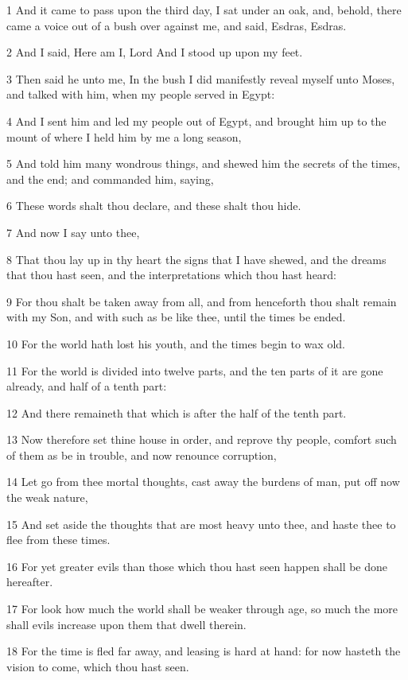 \par 1 And it came to pass upon the third day, I sat under an oak, and, behold, there came a voice out of a bush over against me, and said, Esdras, Esdras.
\par 2 And I said, Here am I, Lord And I stood up upon my feet.
\par 3 Then said he unto me, In the bush I did manifestly reveal myself unto Moses, and talked with him, when my people served in Egypt:
\par 4 And I sent him and led my people out of Egypt, and brought him up to the mount of where I held him by me a long season,
\par 5 And told him many wondrous things, and shewed him the secrets of the times, and the end; and commanded him, saying,
\par 6 These words shalt thou declare, and these shalt thou hide.
\par 7 And now I say unto thee,
\par 8 That thou lay up in thy heart the signs that I have shewed, and the dreams that thou hast seen, and the interpretations which thou hast heard:
\par 9 For thou shalt be taken away from all, and from henceforth thou shalt remain with my Son, and with such as be like thee, until the times be ended.
\par 10 For the world hath lost his youth, and the times begin to wax old.
\par 11 For the world is divided into twelve parts, and the ten parts of it are gone already, and half of a tenth part:
\par 12 And there remaineth that which is after the half of the tenth part.
\par 13 Now therefore set thine house in order, and reprove thy people, comfort such of them as be in trouble, and now renounce corruption,
\par 14 Let go from thee mortal thoughts, cast away the burdens of man, put off now the weak nature,
\par 15 And set aside the thoughts that are most heavy unto thee, and haste thee to flee from these times.
\par 16 For yet greater evils than those which thou hast seen happen shall be done hereafter.
\par 17 For look how much the world shall be weaker through age, so much the more shall evils increase upon them that dwell therein.
\par 18 For the time is fled far away, and leasing is hard at hand: for now hasteth the vision to come, which thou hast seen.
